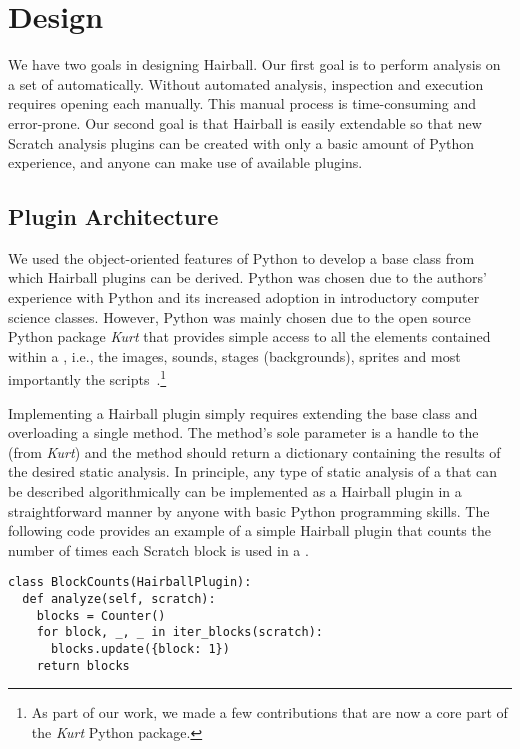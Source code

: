 \section{Design}

We have two goals in designing Hairball. Our first goal is to perform analysis
on a set of  automatically. Without automated analysis, inspection
and execution requires opening each \sprogram{} manually. This manual process
is time-consuming and error-prone.  Our second goal is that Hairball is easily
extendable so that new Scratch analysis plugins can be created with only a
basic amount of Python experience, and anyone can make use of available
plugins.


\subsection{Plugin Architecture}
We used the object-oriented features of Python to develop a base class from
which Hairball plugins can be derived. Python was chosen due to the authors'
experience with Python and its increased adoption in introductory computer
science classes. However, Python was mainly chosen due to the open source
Python package \emph{Kurt} that provides simple access to all the elements
contained within a \sprogram{}, i.e., the images, sounds, stages (backgrounds),
sprites and most importantly the scripts~\cite{Radvan:2012:Online}.\footnote{As
  part of our work, we made a few contributions that are now a core part of the
  \emph{Kurt} Python package.}

Implementing a Hairball plugin simply requires extending the base class and
overloading a single method. The method's sole parameter is a handle to the
\sprogram{} (from \emph{Kurt}) and the method should return a dictionary
containing the results of the desired static analysis. In principle, any type
of static analysis of a \sprogram{} that can be described algorithmically can
be implemented as a Hairball plugin in a straightforward manner by anyone with
basic Python programming skills. The following code provides an example of a
simple Hairball plugin that counts the number of times each Scratch block is
used in a \sprogram{}.

\begin{verbatim}
class BlockCounts(HairballPlugin):
  def analyze(self, scratch):
    blocks = Counter()
    for block, _, _ in iter_blocks(scratch):
      blocks.update({block: 1})
    return blocks
\end{verbatim}

